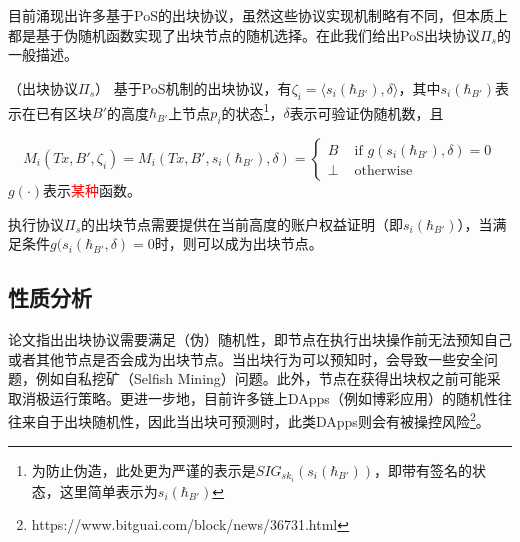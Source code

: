 目前涌现出许多基于PoS的出块协议\cite{gilad2017algorand,david2018ouroboros,hanke2018difinity}，虽然这些协议实现机制略有不同，但本质上都是基于伪随机函数实现了出块节点的随机选择。在此我们给出PoS出块协议$\Pi_{s}$的一般描述。

\begin{definition}
（出块协议$\Pi_{s}$） 基于PoS机制的出块协议，有$\zeta_i=\langle s_i(\hbar_{B'}),\delta \rangle$，其中$s_i(\hbar_{B'})$表示在已有区块$B'$的高度$\hbar_{B'}$上节点$p_i$的状态\footnote{为防止伪造，此处更为严谨的表示是$SIG_{sk_i}(s_i(\hbar_{B'}))$，即带有签名的状态，这里简单表示为$s_i(\hbar_{B'})$}，$\delta$表示可验证伪随机数，且

\begin{equation}
\label{eq:pos}
M_i(Tx,B',\zeta_i)=M_i(Tx,B',s_i(\hbar_{B'}),\delta)=\begin{cases}
B & \text{ if } g(s_i(\hbar_{B'}),\delta)=0 \\ 
\bot & \text{ otherwise}
\end{cases}
\end{equation}
$g(\cdot)$表示\textcolor{red}{某种}函数。
\end{definition}


执行协议$\Pi_{s}$的出块节点需要提供在当前高度的账户权益证明（即$s_i(\hbar_{B'})$），当满足条件$g(s_i(\hbar_{B'},\delta)=0$时，则可以成为出块节点。

\subsection{性质分析}
论文\cite{brown2018formal}指出出块协议需要满足（伪）随机性，即节点在执行出块操作前无法预知自己或者其他节点是否会成为出块节点。当出块行为可以预知时，会导致一些安全问题，例如自私挖矿（Selfish Mining）\cite{eyal2018majority}问题。此外，节点在获得出块权之前可能采取消极运行策略\cite{hanke2018difinity}。更进一步地，目前许多链上DApps（例如博彩应用）的随机性往往来自于出块随机性，因此当出块可预测时，此类DApps则会有被操控风险\footnote{https://www.bitguai.com/block/news/36731.html}。

